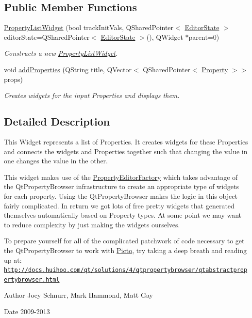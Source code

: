 \subsection*{Public Member Functions}
\begin{DoxyCompactItemize}
\item 
\hyperlink{class_property_list_widget_a071afdff6fd9c0b1afd546b34b43a820}{Property\-List\-Widget} (bool track\-Init\-Vals, Q\-Shared\-Pointer$<$ \hyperlink{class_editor_state}{Editor\-State} $>$ editor\-State=Q\-Shared\-Pointer$<$ \hyperlink{class_editor_state}{Editor\-State} $>$(), Q\-Widget $\ast$parent=0)
\begin{DoxyCompactList}\small\item\em Constructs a new \hyperlink{class_property_list_widget}{Property\-List\-Widget}. \end{DoxyCompactList}\item 
void \hyperlink{class_property_list_widget_a975fb5c361cb0791dcfd120764e3c74e}{add\-Properties} (Q\-String title, Q\-Vector$<$ Q\-Shared\-Pointer$<$ \hyperlink{class_picto_1_1_property}{Property} $>$$>$ props)
\begin{DoxyCompactList}\small\item\em Creates widgets for the input Properties and displays them. \end{DoxyCompactList}\end{DoxyCompactItemize}


\subsection{Detailed Description}
This Widget represents a list of Properties. It creates widgets for these Properties and connects the widgets and Properties together such that changing the value in one changes the value in the other. 

This widget makes use of the \hyperlink{class_property_editor_factory}{Property\-Editor\-Factory} which takes advantage of the Qt\-Property\-Browser infrastructure to create an appropriate type of widgets for each property. Using the Qt\-Property\-Browser makes the logic in this object fairly complicated. In return we got lots of free pretty widgets that generated themselves automatically based on Property types. At some point we may want to reduce complexity by just making the widgets ourselves.

To prepare yourself for all of the complicated patchwork of code necessary to get the Qt\-Property\-Browser to work with \hyperlink{namespace_picto}{Picto}, try taking a deep breath and reading up at\-: \href{http://docs.huihoo.com/qt/solutions/4/qtpropertybrowser/qtabstractpropertybrowser.html}{\tt http\-://docs.\-huihoo.\-com/qt/solutions/4/qtpropertybrowser/qtabstractpropertybrowser.\-html} \begin{DoxyAuthor}{Author}
Joey Schnurr, Mark Hammond, Matt Gay 
\end{DoxyAuthor}
\begin{DoxyDate}{Date}
2009-\/2013 
\end{DoxyDate}


